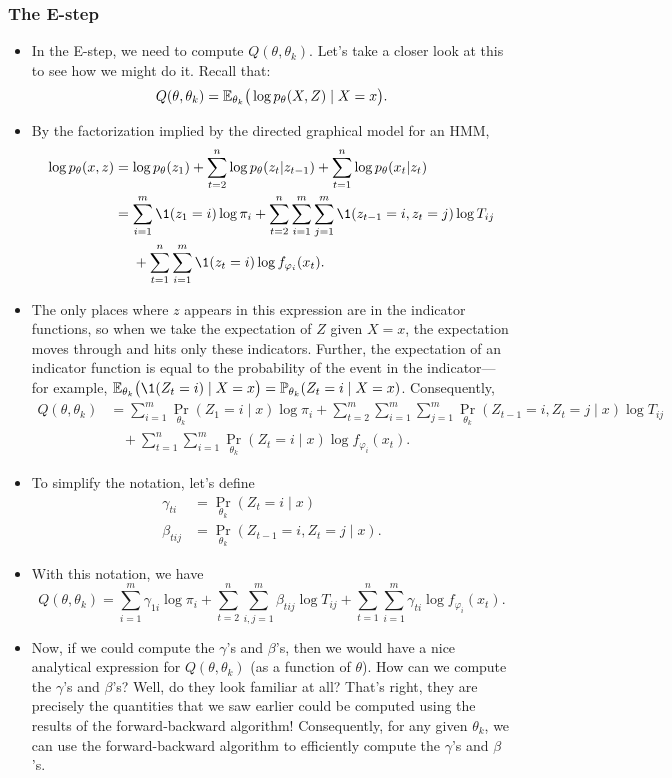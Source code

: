 \documentclass[12pt]{article}
\begin{document}
\subsubsection{The E-step}
\begin{itemize}
\item In the E-step, we need to compute $Q(\theta,\theta_k)$. Let's take a closer look at this to see how we might do it.  Recall that:
$$Q(\theta,\theta_k) = \mathbb{E}_{\theta_k} \big( \log p_\theta(X,Z) \mid X = x \big). $$
\item By the factorization implied by the directed graphical model for an HMM,
\begin{align*}
\log p_\theta(x,z) & = \log p_\theta(z_1) + \sum_{t = 2}^n \log p_\theta(z_t | z_{t -1}) + \sum_{t = 1}^n \log p_\theta(x_t | z_t)\\
& = \sum_{i = 1}^m \1(z_1 = i) \log \pi_i + \sum_{t = 2}^n \sum_{i = 1}^m \sum_{j = 1}^m \1(z_{t -1} = i,z_t = j) \log T_{i j} \\
&~~~~ + \sum_{t = 1}^n \sum_{i = 1}^m \1(z_t = i) \log f_{\varphi_i}(x_t).
\end{align*}
\item The only places where $z$ appears in this expression are in the indicator functions, so when we take the expectation of $Z$ given $X = x$, the expectation moves through and hits only these indicators. Further, the expectation of an indicator function is equal to the probability of the event in the indicator---for example, $\E_{\theta_k} \big( \1(Z_t = i) \mid X = x \big) = \Pr_{\theta_k}(Z_t = i\mid X = x)$. Consequently,
\begin{align*}
Q(\theta,\theta_k) & = 
\sum_{i = 1}^m \Pr_{\theta_k}(Z_1 = i \mid x) \log \pi_i + \sum_{t = 2}^m \sum_{i = 1}^m \sum_{j = 1}^m \Pr_{\theta_k}(Z_{t -1} = i,Z_t = j \mid x) \log T_{i j} \\
&~~~~ + \sum_{t = 1}^n \sum_{i = 1}^m \Pr_{\theta_k}(Z_t = i \mid x) \log f_{\varphi_i}(x_t).
\end{align*}
\item To simplify the notation, let's define
\begin{align*}
\gamma_{t i}& = \Pr_{\theta_k}(Z_t = i \mid x)\\
\beta_{t i j} & = \Pr_{\theta_k}(Z_{t -1} = i,Z_t = j \mid x).
\end{align*}
\item With this notation, we have
$$ Q(\theta,\theta_k) = \sum_{i = 1}^m \gamma_{1 i} \log \pi_i + \sum_{t = 2}^n \sum_{i,j = 1}^m \beta_{t i j} \log T_{i j} + \sum_{t = 1}^n \sum_{i = 1}^m \gamma_{t i} \log f_{\varphi_i}(x_t). $$
\item Now, if we could compute the $\gamma$'s and $\beta$'s, then we would have a nice analytical expression for $Q(\theta,\theta_k)$  (as a function of $\theta$). How can we compute the $\gamma$'s and $\beta$'s? Well, do they look familiar at all? That's right, they are precisely the quantities that we saw earlier could be computed using the results of the forward-backward algorithm! Consequently, for any given $\theta_k$, we can use the forward-backward algorithm to efficiently compute the $\gamma$'s and $\beta$'s. 
\end{itemize}
\end{document}
